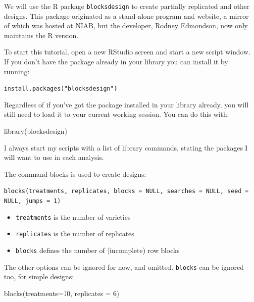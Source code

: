 \documentclass[
]{book}
\newenvironment{Shaded}{\begin{snugshade}}{\end{snugshade}}
\newcommand{\AttributeTok}[1]{\textcolor[rgb]{0.77,0.63,0.00}{#1}}
\newcommand{\DecValTok}[1]{\textcolor[rgb]{0.00,0.00,0.81}{#1}}
\newcommand{\FunctionTok}[1]{\textcolor[rgb]{0.00,0.00,0.00}{#1}}
\newcommand{\NormalTok}[1]{#1}
\providecommand{\tightlist}{%
  \setlength{\itemsep}{0pt}\setlength{\parskip}{0pt}}
\begin{document}
We will use the R package \texttt{blocksdesign}\citep{R-blocksdesign} to create partially replicated and other designs. This package originated as a stand-alone program and website, a mirror of which was hosted at NIAB, but the developer, Rodney Edmondson, now only maintains the R version.

To start this tutorial, open a new RStudio screen and start a new script window. If you don't have the package already in your library you can install it by running:

\texttt{install.packages("blocksdesign")}

Regardless of if you've got the package installed in your library already, you will still need to load it to your current working session. You can do this with:

\begin{Shaded}
\begin{Highlighting}[]
\FunctionTok{library}\NormalTok{(blocksdesign)}
\end{Highlighting}
\end{Shaded}

I always start my scripts with a list of library commands, stating the packages I will want to use in each analysis.

The command blocks is used to create designs:

\texttt{blocks(treatments,\ replicates,\ blocks\ =\ NULL,\ searches\ =\ NULL,\ seed\ =\ NULL,\ jumps\ =\ 1)}

\begin{itemize}
\tightlist
\item
  \texttt{treatments} is the number of varieties
\item
  \texttt{replicates} is the number of replicates
\item
  \texttt{blocks} defines the number of (incomplete) row blocks
\end{itemize}

The other options can be ignored for now, and omitted. \texttt{blocks} can be ignored too, for simple designs:

\begin{Shaded}
\begin{Highlighting}[]
\FunctionTok{blocks}\NormalTok{(}\AttributeTok{treatments=}\DecValTok{10}\NormalTok{, }\AttributeTok{replicates =} \DecValTok{6}\NormalTok{)}
\end{Highlighting}
\end{Shaded}
\end{document}
